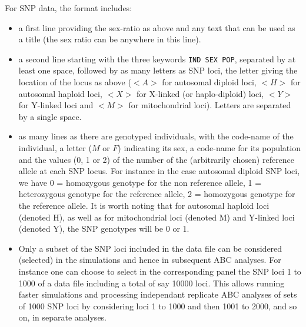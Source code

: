 For SNP data, the format includes:
\begin{itemize}
 \item a first line providing the sex-ratio as above and any text that can be used as a title (the sex ratio can be anywhere in this line).
 \item a second line starting with the three keywords \texttt{IND  SEX  POP}, separated by at least one space, followed by as many letters as SNP loci, the letter giving the location of the locus as above ($<A>$ for autosomal diploid loci, $<H>$ for autosomal haploid loci, $<X>$ for X-linked (or haplo-diploid) loci, $<Y>$ for Y-linked loci and $<M>$ for mitochondrial loci). Letters are separated by a single space.
 \item as many lines as there are genotyped individuals, with the code-name of the individual, a letter ($M$ or $F$) indicating its sex, a code-name for its population and the values (0, 1 or 2) of the number of the (arbitrarily chosen) reference allele at each SNP locus. For instance in the case autosomal diploid SNP loci, we have 0 = homozygous genotype for the non reference allele, 1 = heterozygous genotype for the reference allele, 2 = homozygous genotype for the reference allele. It is worth noting that for autosomal haploid loci (denoted H), as well as for mitochondrial loci (denoted M) and Y-linked loci (denoted Y), the SNP genotypes will be 0 or 1.
\item Only a subset of the SNP loci included in the data file can be considered (selected) in the simulations and hence in subsequent  ABC analyses. For instance one can choose to select in the corresponding panel  the SNP loci 1 to 1000 of a data file including a total of say 10000 loci. This allows running faster simulations and processing  independant replicate ABC analyses of sets of 1000 SNP loci by considering loci 1 to 1000 and then 1001 to 2000, and so on, in separate analyses.
\end{itemize}


